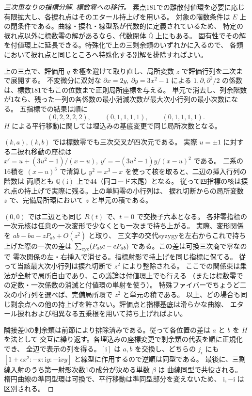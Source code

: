 \begin{proof}[三次重なりの指標分解]
\smallskip
\noindent\textit{標数零への移行。}
素点181での離散付値環を必要に応じ有限拡大し、各捩れ点はそのエタール持上げを用いる。
対象の階数条件は $E$ 上の閉条件である。曲線・捩れ・線型系が代数的に定義されているため、
特定の捩れ点以外に標数零の解があるなら、代数閉体 $\overline{\mathbb Q}$ 上にもある。
固有性でその解を付値環上に延長できる。特殊化で上の三剰余類のいずれかに入るので、
各類において捩れ点と同じところへ特殊化する別解を排除すればよい。

上の三点で、評価用 $q$ を極を避けて取り直し、局所変数 $z$ で評価行列を二次まで展開する。
不変微分に双対な $\partial x=2y,\ \partial y=3x^2-1$ による
$1,\partial,\partial^2/2$ の係数は、標数181でもこの位数まで正則局所座標を与える。
単元で消去し、列余階数が1なら、残った一列の各係数の最小消滅次数が最大次小行列の最小次数になる。
五指標での結果は順に
\[
 (0,2,2,2,2),\qquad (0,1,1,1,1),\qquad (0,1,1,1,1).
\]
$H$ による平行移動に関しては埋込みの基底変更で同じ局所次数となる。

$(k,a),(k,b)$ では標数零でも三次交叉が四次元である。
実際 $u=\pm1$ に対する二捩れ移動の座標は
$x'=u+(3u^2-1)/(x-u),\ y'=-(3u^2-1)y/(x-u)^2$ である。
二系の16積を $(x-u)^3$ で清算し $y^2=x^3-x$ を使って核を取ると、二辺の挿入行列の階数は
両順とも $\mathbb Q(\mathrm i)$ 上で44（同コード末尾）となる。
従って四指標の核は捩れ点の持上げで実際に残る。上の単純零の小行列は、
捩れ切断からの局所変数 $z$ で、完備局所環において $z$ と単元の積である。

$(0,0)$ では二辺とも同じ $R(t)$ で、$t=0$ で交換子六本となる。
各非零指標の一次元核は任意の一次変形で少なくとも一次まで持ち上がる。
実際、変形関係を $ab-ba-zP_{ab}+O(z^2)$ と取り、
三文字の交代syzygyを左右からこれで持ち上げた際の一次の差は
$\sum_{\rm cyc}(P_{ab}c-cP_{ab})$ である。この差は可換三次商で零なので
零次関係の左・右挿入で消せる。指標射影で持上げを同じ指標に保てる。
従って当該最大次小行列は捩れ切断で $z^2$ により整除される。
ここでの関係束は乗法が全射で局所自由であり、この議論は付値環上でも行える
（または標数零での定数・一次係数の消滅と付値環の単射を使う）。
特殊ファイバーでちょうど二次の小行列を選べば、完備局所環で $z^2$ と単元の積である。
以上、どの場合も同じ剰余点への他の持上げを許さない。評価点と指標基底は滑らかな曲線、
エタール捩れおよび相異なる五乗根を用いて持ち上げればよい。

隣接差0の剰余類は前節により排除済みである。従って各位置の差は $a$ と $b$ を $H$ を法として
交互に繰り返す。各埋込みの座標変更で剰余類の代表を順に正規化でき、
全辺で表示の列を得る。$[\mathrm i]$ は $a,b$ を交換し、どちらの $j_\epsilon$ にも
$[1+\epsilon x^2:-x:\mathrm i y:-\mathrm i xy]$ と線型に作用するので逆順は同型である。
最後に、三割線入射のうち第一射影次数1の成分が決める単数 $\beta$ は
曲線同型で共役される。楕円曲線の準同型環は可換で、平行移動は準同型部分を変えないため、
$\mathrm i,-\mathrm i$ は区別される。
\end{proof}
